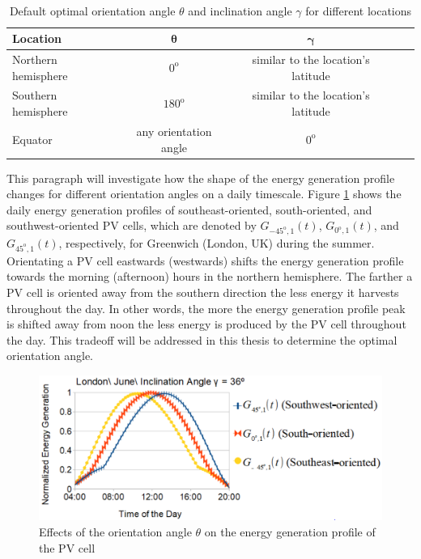 \begin{table}[H]
 \centering
\captionsetup{justification=centering}
\caption{\\ Default optimal orientation angle $\theta$ and inclination angle $\gamma$ for different locations \cite{Solar_Cell} \label{over}}
\label{overview}
\begin{tabularx}{\columnwidth}{@{}l*{2}{|C}Cc@{}}\toprule
\textbf{Location}					&  $\boldsymbol{\theta}$ 	&$\boldsymbol{\gamma}$ \\ \midrule
Northern hemisphere	& $0^{\mathrm{o}}$ 																&similar to the location's latitude						\\ 
Southern hemisphere	& $180^{\mathrm{o}}$ 															&similar to the location's latitude						\\ 
Equator							& any orientation angle &$0^{\mathrm{o}}$\\ \bottomrule
\end{tabularx}
\end{table}



This paragraph will investigate how the shape of the energy generation profile changes for different orientation angles on a daily timescale. 
Figure \ref{different_orientation_profiles} shows the daily energy generation profiles of southeast-oriented, south-oriented, and southwest-oriented PV cells, which are denoted by $G_{-45^{\mathrm{o}},1}(t)$, $G_{0^{\mathrm{o}},1}(t)$, and $G_{45^{\mathrm{o}},1}(t)$, respectively, for Greenwich (London, UK) during the summer. Orientating a PV cell eastwards (westwards) shifts the energy generation profile towards the morning (afternoon) hours in the northern hemisphere. The farther a PV cell is oriented away from the southern direction the less energy it harvests throughout the day. In other words, the more the energy generation profile peak is shifted away from noon the less energy is produced by the PV cell throughout the day. This tradeoff will be addressed in this thesis to determine the optimal orientation angle. 



\begin{figure}[H]
	\centering
		\includegraphics[width=1\columnwidth]{pictures/orien}
\caption{Effects of the orientation angle $\theta$ on the energy generation profile of the PV cell\label{different_orientation_profiles}}
\end{figure}

